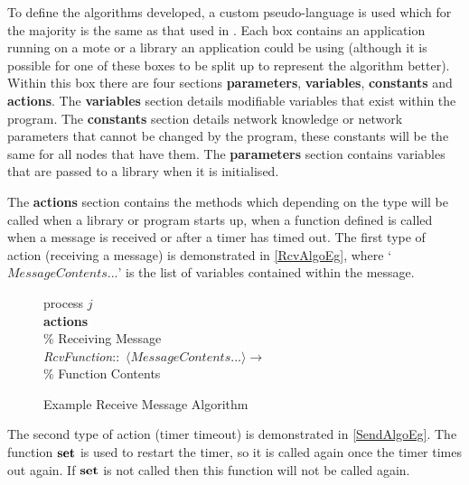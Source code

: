 To define the algorithms developed, a custom pseudo-language is used which for the majority is the same as that used in \cite{MBCS310}. Each box contains an application running on a mote or a library an application could be using (although it is possible for one of these boxes to be split up to represent the algorithm better). Within this box there are four sections \textbf{parameters}, \textbf{variables}, \textbf{constants} and \textbf{actions}. The \textbf{variables} section details modifiable variables that exist within the program. The \textbf{constants} section details network knowledge or network parameters that cannot be changed by the program, these constants will be the same for all nodes that have them. The \textbf{parameters} section contains variables that are passed to a library when it is initialised.

The \textbf{actions} section contains the methods which depending on the type will be called when a library or program starts up, when a function defined is called when a message is received or after a timer has timed out. The first type of action (receiving a message) is demonstrated in \autoref{RcvAlgoEg}, where `$MessageContents...$' is the list of variables contained within the message.

\begin{figure}[H]
  \centering
  \begin{boxedminipage}{\linewidth}
    \null process $j$\\
    \null \textbf{actions}\\
    \null\qq \% Receiving Message\\
    \null\qq \emph{RcvFunction}::~$\langle MessageContents...\rangle \rightarrow$\\
    \null\qq\qq \% Function Contents\\
  \end{boxedminipage}
  \caption{Example Receive Message Algorithm}
  \label{RcvAlgoEg}
\end{figure}

The second type of action (timer timeout) is demonstrated in \autoref{SendAlgoEg}. The function $\mbox{\textbf{set}}$ is used to restart the timer, so it is called again once the timer times out again. If $\mbox{\textbf{set}}$ is not called then this function will not be called again.

